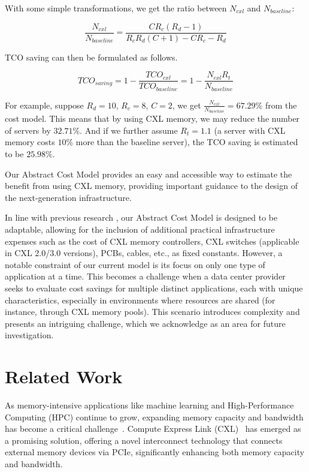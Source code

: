 With some simple transformations, we get the ratio between $N_{cxl}$ and $N_{baseline}$: 

$$ \frac{N_{cxl}}{N_{baseline}} = \frac{CR_c(R_d - 1)}{R_cR_d(C+1) - C R_c - R_d} $$

TCO saving can then be formulated as follows.

$$
TCO_{saving}=1-\frac{TCO_{cxl}}{TCO_{baseline}}=1-\frac{N_{cxl} R_t}{N_{baseline}}
$$


For example, suppose $ R_d = 10 $, $R_c = 8 $, $ C = 2 $, we get $\frac{N_{cxl}}{N_{baseline}} = 67.29\%$ from the cost model.
This means that by using CXL memory, we may reduce the number of servers by $32.71\%$.
And if we further assume $R_t=1.1$ (a server with CXL memory costs $10\%$ more than the baseline server), the TCO saving is estimated to be $25.98\%$.

Our Abstract Cost Model provides an easy and accessible way to estimate the benefit from using CXL memory,
providing important guidance to the design of the next-generation infrastructure.

In line with previous research \cite{CXLPoolCost}, our Abstract Cost Model is designed to be adaptable, allowing for the inclusion of additional practical infrastructure expenses such as the cost of CXL memory controllers, CXL switches (applicable in CXL 2.0/3.0 versions), PCBs, cables, etc., as fixed constants. However, a notable constraint of our current model is its focus on only one type of application at a time. This becomes a challenge when a data center provider seeks to evaluate cost savings for multiple distinct applications, each with unique characteristics, especially in environments where resources are shared (for instance, through CXL memory pools). This scenario introduces complexity and presents an intriguing challenge, which we acknowledge as an area for future investigation.

\section{Related Work}

As memory-intensive applications like machine learning and High-Performance Computing (HPC) continue to grow, expanding memory capacity and bandwidth has become a critical challenge~\cite{dataintensive, FlatFlash, cxl-ssd}. Compute Express Link (CXL)~\cite{cxl, cxl_azure, cxlcentric} has emerged as a promising solution, offering a novel interconnect technology that connects external memory devices via PCIe, significantly enhancing both memory capacity and bandwidth.

